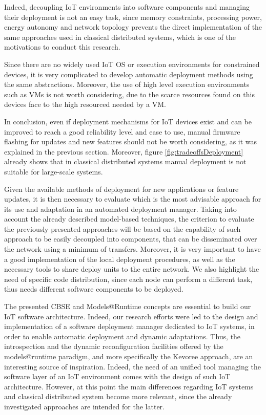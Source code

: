 Indeed, decoupling IoT environments into software components and managing their deployment is not an easy task, since memory constraints, processing power, energy autonomy and network topology prevents the direct implementation of the same approaches used in classical distributed systems, which is one of the motivations to conduct this research.

Since there are no widely used IoT OS or execution environments for constrained devices, it is very complicated to develop automatic deployment methods using the same abstractions.
Moreover, the use of high level execution environments such as VMs is not worth considering, due to the scarce resources found on this devices face to the high resourced needed by a VM.

In conclusion, even if deployment mechanisms for IoT devices exist and can be improved to reach a good reliability level and ease to use, manual firmware flashing for updates and new features should not be worth considering, as it was explained in the previous section.
Moreover, figure \ref{fig:tradeoffsDeployment} already shows that in classical distributed systems manual deployment is not suitable for large-scale systems.

Given the available methods of deployment for new applications or feature updates, it is then necessary to evaluate which is the most advisable approach for its use and adaptation in an automated deployment manager.
Taking into account the already described model-based techniques, the criterion to evaluate the previously presented approaches will be based on the capability of such approach to be easily decoupled into components, that can be disseminated over the network using a minimum of transfers.
Moreover, it is very important to have a good implementation of the local deployment procedures, as well as the necessary tools to share deploy units to the entire network.
We also highlight the need of specific code distribution, since each node can perform a different task, thus needs different software components to be deployed.

The presented CBSE and Models@Runtime concepts are essential to build our IoT software architecture.
Indeed, our research efforts were led to the design and implementation of a software deployment manager dedicated to IoT systems, in order to enable automatic deployment and dynamic adaptations.
Thus, the introspection and the dynamic reconfiguration facilities offered by the models@runtime paradigm, and more specifically the Kevoree approach, are an interesting source of inspiration.
Indeed, the need of an unified tool managing the software layer of an IoT environment comes with the design of such IoT architecture.
However, at this point the main differences regarding IoT systems and classical distributed system become more relevant, since the already investigated approaches are intended for the latter.

